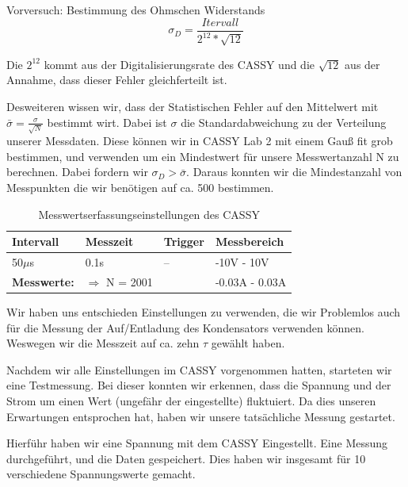 \documentclass[twoside]{protokoll}
\begin{document}
\begin{aufgabe}{Vorversuch: Bestimmung des Ohmschen Widerstands}
 \begin{equation}
  \sigma_D = \frac{Itervall}{2^{12}*\sqrt{12}}
 \end{equation}
 
 Die $2^{12}$ kommt aus der Digitalisierungsrate des CASSY und die $\sqrt{12}$ aus der Annahme, dass dieser Fehler gleichferteilt ist. 
 
 Desweiteren wissen wir, dass der Statistischen Fehler auf den Mittelwert mit $ \bar{\sigma} = \frac{\sigma}{\sqrt{N}}$ bestimmt wirt.
 Dabei ist $\sigma$ die Standardabweichung zu der Verteilung unserer Messdaten.
 Diese können wir in CASSY Lab 2 mit einem Gauß fit grob bestimmen, und verwenden um ein Mindestwert für unsere Messwertanzahl N zu berechnen.
 Dabei fordern wir $\sigma_D > \bar{\sigma}$. Daraus konnten wir die Mindestanzahl von Messpunkten die wir benötigen auf ca. 500 bestimmen.
 
\begin{table}[H]
        \centering
        \begin{tabularx}{1\textwidth}{X X X X} %
            \toprule
            \textbf{Intervall} & \textbf{Messzeit} & \textbf{Trigger} & \textbf{Messbereich} \\
            \midrule
            50$\mu$s  & 0.1s & -- & -10V - 10V \\
            \textbf{Messwerte:}& $\Rightarrow$ N = 2001& & -0.03A - 0.03A\\
            \bottomrule
        \end{tabularx}
        \caption{Messwertserfassungseinstellungen des CASSY}
        \label{tab:mytable}
    \end{table}

Wir haben uns entschieden Einstellungen zu verwenden, die wir Problemlos auch für die Messung der Auf/Entladung des Kondensators verwenden können. Weswegen wir die Messzeit auf ca. zehn $\tau$ gewählt haben. 

Nachdem wir alle Einstellungen im CASSY vorgenommen hatten, starteten wir eine Testmessung. Bei dieser konnten wir erkennen, dass die Spannung und der Strom um einen Wert (ungefähr der eingestellte) fluktuiert. 
Da dies unseren Erwartungen entsprochen hat, haben wir unsere tatsächliche Messung gestartet. 

Hierführ haben wir eine Spannung mit dem CASSY Eingestellt. Eine Messung durchgeführt, und die Daten gespeichert. Dies haben wir insgesamt für 10 verschiedene Spannungswerte gemacht. \\


\end{aufgabe}
\end{document}
